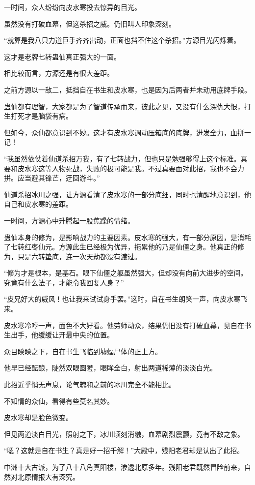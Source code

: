 \begin{this_body}
一时间，众人纷纷向皮水寒投去惊异的目光。

虽然没有打破血幕，但这杀招之威。仍旧叫人印象深刻。

“就算是我八只力道巨手齐齐出动，正面也挡不住这个杀招。”方源目光闪烁着。

这才是老牌七转蛊仙真正强大的一面。

相比较而言，方源还是有很大差距。

之前方源以一敌二，抵挡自在书生和皮水寒，也是因为后两者并未动用底牌手段。

蛊仙都有理智，大家都是为了智道传承而来，彼此之见，又没有什么深仇大恨，打生打死才是脑袋有病。

但如今，众仙都意识到不妙。这才有皮水寒调动压箱底的底牌，迸发全力，血拼一记！

“我虽然依仗着仙道杀招万我，有了七转战力，但也只是勉强够得上这个标准。真要和皮水寒这等人物死战，失败的极可能是我。不过真要面对此招，我也不会力拼。应当避其锋芒，迂回游斗。”

仙道杀招冰川之强，让方源看清了皮水寒的一部分底细，同时也清醒地意识到，他自己和皮水寒的差距。

一时间，方源心中升腾起一股焦躁的情绪。

蛊仙本身的修为，是影响战力的主要因素。皮水寒的强大，有一部分原因，是消耗了七转红枣仙元。方源此生已经极为优异，拖累他的乃是仙僵之身。他真正的修为，只是六转垫底，连一次天劫都没有渡过。

“修为才是根本，是基石。眼下仙僵之躯虽然强大，但却没有向前大进步的空间。究竟有什么法子，才能令我回复人身？”

“皮兄好大的威风！也让我来试试身手罢。”这时，自在书生朗笑一声，向皮水寒飞来。

皮水寒冷哼一声，面色不大好看。他劳师动众，结果仍旧没有打破血幕，见自在书生出手，他缓缓让开最中央的位置。

众目睽睽之下，自在书生飞临到墟蝠尸体的正上方。

他早已经酝酿，陡然双眼圆瞪，眼眸全白，射出两道稀薄的淡淡白光。

此招近乎悄无声息，论气魄和之前的冰川完全不能相比。

不知情的众仙，看得有些莫名其妙。

皮水寒却是脸色微变。

但见两道淡白目光，照射之下，冰川顷刻消融，血幕剧烈震颤，竟有不敌之象。

“嗯？这就是自在书生？真是好一招千解！”大殿中，残阳老君却是认出了此招。

中洲十大古派，为了八十八角真阳楼，渗透北原多年。残阳老君既然冒险前来，自然对北原情报大有深究。


\end{this_body}
